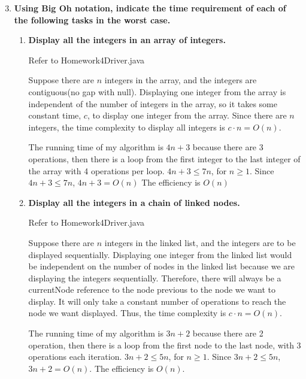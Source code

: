 \documentclass[10pt]{article}
\begin{document}
\begin{enumerate}
		\setcounter{enumi}{2}
		\item \textbf{Using Big Oh notation, indicate the time requirement of each of the following tasks in the worst case.}
			\begin{enumerate}
				\item \textbf{Display all the integers in an array of integers.}
				
					\vspace{0.5cm}
					Refer to Homework4Driver.java
					
					\vspace{0.5cm}
					Suppose there are $n$ integers in the array, and the integers are contiguous(no gap with null). Displaying one integer from the array is independent of the number of integers in the array, so it takes some constant time, $c$, to display one integer from the array. Since there are $n$ integers, the time complexity to display all integers is $c \cdot n = O(n)$.
					
					\vspace{0.5cm}
					The running time of my algorithm is $4n + 3$ because there are 3 operations, then there is a loop from the first integer to the last integer of the array with 4 operations per loop. $4n + 3 \leq 7n$, for $n \geq 1$. Since $4n + 3 \leq 7n$, $4n + 3 = O(n)$ The efficiency is $O(n)$
					\vspace{0.5cm}
				
				\item \textbf{Display all the integers in a chain of linked nodes.}
				
					\vspace{0.5cm}
					Refer to Homework4Driver.java
					
					\vspace{0.5cm}
					Suppose there are $n$ integers in the linked list, and the integers are to be displayed sequentially. Displaying one integer from the linked list would be independent on the number of nodes in the linked list because we are displaying the integers sequentially. Therefore, there will always be a currentNode reference to the node previous to the node we want to display. It will only take a constant number of operations to reach the node we want displayed. Thus, the time complexity is $c \cdot n = O(n)$.
					
					\vspace{0.5cm}
					The running time of my algorithm is $3n + 2$ because there are 2 operation, then there is a loop from the first node to the last node, with 3 operations each iteration. $3n + 2 \leq 5n$, for $n \geq 1$. Since $3n + 2 \leq 5n$, $3n + 2 = O(n)$. The efficiency is $O(n)$.
					\vspace{0.5cm}
				

\end{enumerate}
\end{enumerate}
\end{document}
